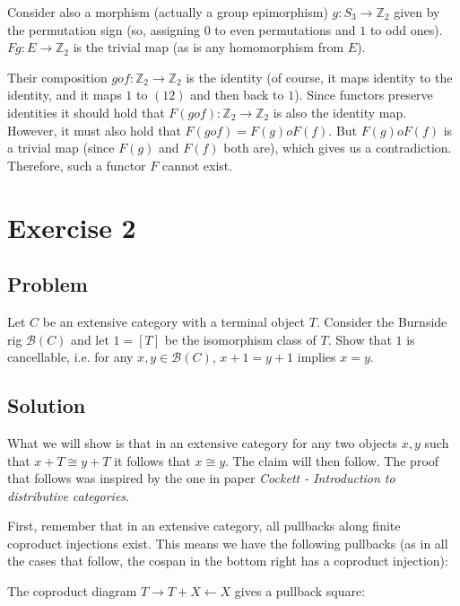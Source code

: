 \documentclass{article}
\begin{document}
Consider also a morphism (actually a group epimorphism) $g: S_3 \to \mathbb{Z}_2$ given by the permutation sign (so,  assigning $0$ to even permutations and $1$ to odd ones). $Fg: E \to \mathbb{Z}_2$ is the trivial map (as is any homomorphism from $E$).

Their composition $g o f : \mathbb{Z}_2 \to \mathbb{Z}_2$ is the identity (of course, it maps identity to the identity, and it maps $1$ to $(12)$ and then back to $1$). Since functors preserve identities it should hold that $F(g o f) : \mathbb{Z}_2 \to \mathbb{Z}_2$ is also the identity map. However, it must also hold that $F(g o f) = F(g) o F(f)$. But $F(g) o F(f)$ is a trivial map (since $F(g)$ and $F(f)$ both are), which gives us a contradiction. Therefore, such a functor $F$ cannot exist.
\newpage
\section*{Exercise 2}
\subsection*{Problem}
Let $C$ be an extensive category with a terminal object $T$. Consider the Burnside rig $\mathcal{B}(C)$ and let $1 = [T]$ be the isomorphism class of $T$. Show that $1$ is cancellable, i.e. for any $x,y \in \mathcal{B}(C)$, $x+1=y+1$ implies $x=y$.
\subsection*{Solution}
What we will show is that in an extensive category for any two objects $x,y$ such that $x+T \cong y+T$ it follows that $x \cong y$. The claim will then follow.
The proof that follows was inspired by the one in paper \textit{Cockett - Introduction to distributive categories}.

First, remember that in an extensive category, all pullbacks along finite coproduct injections exist. This means we have the following pullbacks (as in all the cases that follow, the cospan in the bottom right has a coproduct injection):

The coproduct diagram $T \rightarrow T+X \leftarrow X$ gives a pullback square:

\begin{center}\end{center}
\end{document}
